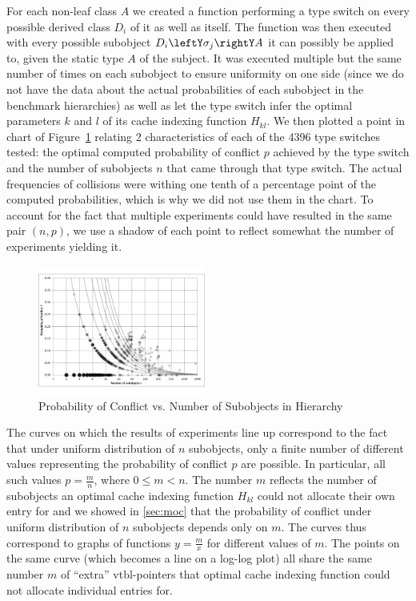 For each non-leaf class $A$ we created a function performing a type switch on 
every possible derived class $D_i$ of it as well as itself. The function was 
then executed with every possible subobject $D_i\leftY\sigma_j\rightY A$ it can  
possibly be applied to, given the static type $A$ of the subject. It was 
executed multiple but the same number of times on each subobject to ensure 
uniformity on one side (since we do not have the data about the actual 
probabilities of each subobject in the benchmark hierarchies) as well as let the 
type switch infer the optimal parameters $k$ and $l$ of its cache indexing 
function $H_{kl}$. We then plotted a point in chart of Figure~\ref{fig:prob} 
relating 2 characteristics of each of the 4396 type switches tested: the optimal 
computed probability of conflict $p$ achieved by the type switch and the number 
of subobjects $n$ that came through that type switch. The actual frequencies of 
collisions were withing one tenth of a percentage point of the computed 
probabilities, which is why we did not use them in the chart. To account for the 
fact that multiple experiments could have resulted in the same pair $(n,p)$, we 
use a shadow of each point to reflect somewhat the number of experiments 
yielding it.

\begin{figure}[htbp]
  \centering
    \includegraphics[width=0.49\textwidth]{ClassHierarchies.pdf}
  \caption{Probability of Conflict vs. Number of Subobjects in Hierarchy}
  \label{fig:prob}
\end{figure}

The curves on which the results of experiments line up correspond to the fact 
that under uniform distribution of $n$ subobjects, only a finite number of 
different values representing the probability of conflict $p$ are possible. In 
particular, all such values $p=\frac{m}{n}$, where $0 \le m < n$. The number $m$ 
reflects the number of subobjects an optimal cache indexing function $H_{kl}$ 
could not allocate their own entry for and we showed in \textsection\ref{sec:moc} 
that the probability of conflict under uniform distribution of $n$ subobjects 
depends only on $m$. The curves thus correspond to graphs of functions 
$y=\frac{m}{x}$ for different values of $m$. The points on the same curve (which 
becomes a line on a log-log plot) all share the same number $m$ of ``extra'' 
vtbl-pointers that optimal cache indexing function could not allocate individual 
entries for.

